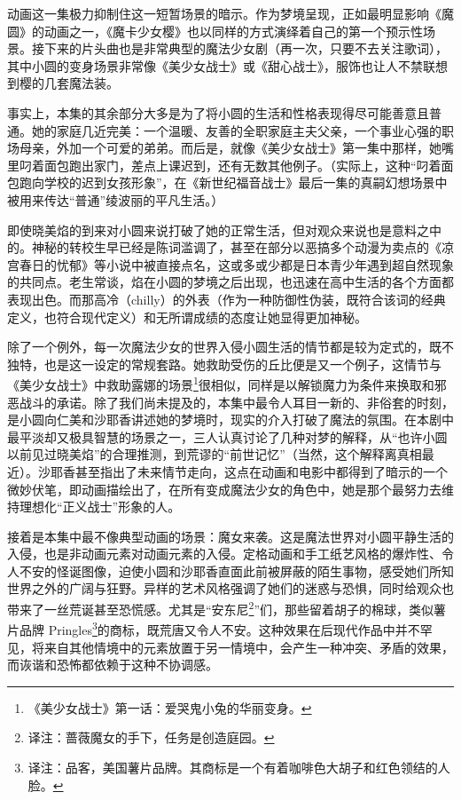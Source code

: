 动画这一集极力抑制住这一短暂场景的暗示。作为梦境呈现，正如最明显影响《魔圆》的动画之一，《魔卡少女樱》也以同样的方式演绎着自己的第一个预示性场景\cite{ref11}。接下来的片头曲也是非常典型的魔法少女剧（再一次，只要不去关注歌词），其中小圆的变身场景非常像《美少女战士》\cite{ref12}或《甜心战士》\cite{ref13}，服饰也让人不禁联想到樱的几套魔法装。

事实上，本集的其余部分大多是为了将小圆的生活和性格表现得尽可能善意且普通。她的家庭几近完美：一个温暖、友善的全职家庭主夫父亲，一个事业心强的职场母亲，外加一个可爱的弟弟。而后是，就像《美少女战士》第一集中那样，她嘴里叼着面包跑出家门，差点上课迟到，还有无数其他例子。（实际上，这种“叼着面包跑向学校的迟到女孩形象”，在《新世纪福音战士》最后一集的真嗣幻想场景中被用来传达“普通”绫波丽的平凡生活\cite{ref14}。）

即使晓美焰的到来对小圆来说打破了她的正常生活，但对观众来说也是意料之中的。神秘的转校生早已经是陈词滥调了，甚至在部分以恶搞多个动漫为卖点的《凉宫春日的忧郁》等小说\cite{ref15}中被直接点名，这或多或少都是日本青少年遇到超自然现象的共同点。老生常谈，焰在小圆的梦境之后出现，也迅速在高中生活的各个方面都表现出色。而那高冷（chilly）的外表（作为一种防御性伪装，既符合该词的经典定义，也符合现代定义）和无所谓成绩的态度让她显得更加神秘。

除了一个例外，每一次魔法少女的世界入侵小圆生活的情节都是较为定式的，既不独特，也是这一设定的常规套路。她救助受伤的丘比便是又一个例子，这情节与《美少女战士》中救助露娜的场景\footnote{《美少女战士》第一话：爱哭鬼小兔的华丽变身。}很相似，同样是以解锁魔力为条件来换取和邪恶战斗的承诺。除了我们尚未提及的，本集中最令人耳目一新的、非俗套的时刻，是小圆向仁美和沙耶香讲述她的梦境时，现实的介入打破了魔法的氛围。在本剧中最平淡却又极具智慧的场景之一，三人认真讨论了几种对梦的解释，从“也许小圆以前见过晓美焰”的合理推测，到荒谬的“前世记忆”（当然，这个解释离真相最近）。沙耶香甚至指出了未来情节走向，这点在动画和电影中都得到了暗示的一个微妙伏笔，即动画描绘出了，在所有变成魔法少女的角色中，她是那个最努力去维持理想化“正义战士”形象的人。

接着是本集中最不像典型动画的场景：魔女来袭。这是魔法世界对小圆平静生活的入侵，也是非动画元素对动画元素的入侵。定格动画和手工纸艺风格的爆炸性、令人不安的怪诞图像，迫使小圆和沙耶香直面此前被屏蔽的陌生事物，感受她们所知世界之外的广阔与狂野。异样的艺术风格强调了她们的迷惑与恐惧，同时给观众也带来了一丝荒诞甚至恐慌感。尤其是“安东尼\footnote{译注：蔷薇魔女的手下，任务是创造庭园。}”们，那些留着胡子的棉球，类似薯片品牌 Pringles\footnote{译注：品客，美国薯片品牌。其商标是一个有着咖啡色大胡子和红色领结的人脸。}的商标，既荒唐又令人不安。这种效果在后现代作品中并不罕见，将来自其他情境中的元素放置于另一情境中，会产生一种冲突、矛盾的效果\cite{ref16}，而诙谐\cite{ref17}和恐怖\cite{ref18}都依赖于这种不协调感。

